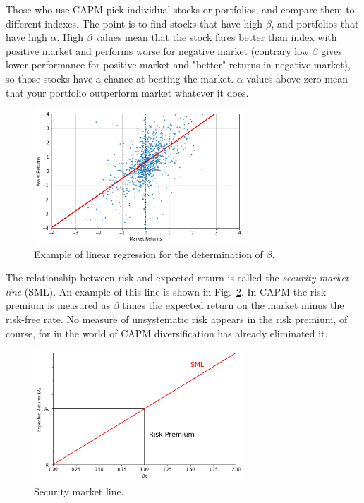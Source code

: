 Those who use CAPM pick individual stocks or portfolios, and compare them to different indexes. The point is to find stocks that have high $\beta$, and portfolios that have high $\alpha$. High $\beta$ values mean that the stock fares better than index with positive market and performs worse for negative market (contrary low $\beta$ gives lower performance for positive market and "better" returns in negative market), so those stocks have a chance at beating the market. $\alpha$ values above zero mean that your portfolio outperform market whatever it does.

\begin{figure}[htb]
	\centering
	\includegraphics[width=0.7\textwidth]{figures/linear_regression}
	\caption{Example of linear regression for the determination of $\beta$.}
	\label{fig:linear_regression}
\end{figure}

The relationship between risk and expected return is called the \emph{security market line} (SML). An example of this line is shown in Fig.~\ref{fig:sel}. %
In CAPM the risk premium is measured as $\beta$ times the expected return on the market minus the risk-free rate. No measure of unsystematic risk appears in the risk premium, of course, for in the world of CAPM diversification has already eliminated it.

\begin{figure}[htb]
	\centering
	\includegraphics[width=0.7\textwidth]{figures/sel}
	\caption{Security market line.}
	\label{fig:sel}
\end{figure}

